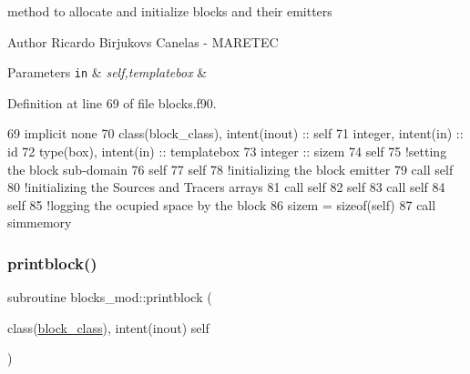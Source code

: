 method to allocate and initialize blocks and their emitters 

\begin{DoxyAuthor}{Author}
Ricardo Birjukovs Canelas -\/ M\+A\+R\+E\+T\+EC
\end{DoxyAuthor}

\begin{DoxyParams}[1]{Parameters}
\mbox{\tt in}  & {\em self,templatebox} & \\
\hline
\end{DoxyParams}


Definition at line 69 of file blocks.\+f90.


\begin{DoxyCode}
69     \textcolor{keywordtype}{implicit none}
70     \textcolor{keywordtype}{class}(block\_class), \textcolor{keywordtype}{intent(inout)} :: self
71     \textcolor{keywordtype}{integer}, \textcolor{keywordtype}{intent(in)} :: id
72     \textcolor{keywordtype}{type}(box), \textcolor{keywordtype}{intent(in)} :: templatebox
73     \textcolor{keywordtype}{integer} :: sizem
74     self%
75     \textcolor{comment}{!setting the block sub-domain}
76     self%
77     self%
78     \textcolor{comment}{!initializing the block emitter}
79     \textcolor{keyword}{call }self%
80     \textcolor{comment}{!initializing the Sources and Tracers arrays}
81     \textcolor{keyword}{call }self%
82     self%
83     \textcolor{keyword}{call }self%
84     self%
85     \textcolor{comment}{!logging the ocupied space by the block}
86     sizem = sizeof(self)
87     \textcolor{keyword}{call }simmemory%
\end{DoxyCode}
\mbox{\label{namespaceblocks__mod_a6eab8b323cb15dcecb5c6b0c31b4e246}} 
\subsubsection{\texorpdfstring{printblock()}{printblock()}}
{\footnotesize\ttfamily subroutine blocks\+\_\+mod\+::printblock (\begin{DoxyParamCaption}\item[{class(\mbox{\hyperlink{structblocks__mod_1_1block__class}{block\+\_\+class}}), intent(inout)}]{self }\end{DoxyParamCaption})\hspace{0.3cm}{\ttfamily [private]}}



